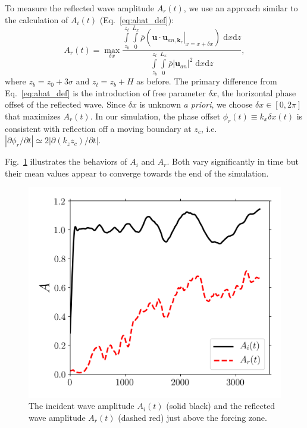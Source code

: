 \documentclass[
        fleqn,
        usenatbib,
    ]{mnras}
\newcommand*{\pdil}[2]{\partial#1/\partial#2}
\newcommand*{\at}[1]{\left.#1\right|}
\newcommand*{\abs}[1]{\left|#1\right|}
\newcommand*{\p}[1]{\left(#1\right)}
\newcommand*{\bm}[1]{\mathbf{#1}}
\begin{document}
To measure the reflected wave amplitude $A_r(t)$, we use an approach similar to
the calculation of $A_i(t)$ (Eq.~\eqref{eq:ahat_def}):
\begin{equation}
    A_r(t) = \max_{\delta x}\frac{\int\limits_{z_b}^{z_t}\int\limits_0^{L_x}
        \overline{\rho}\p{\bm{u} \cdot \at{\bm{u}_{an,
        \bm{k}_r}}_{x = x + \delta x}}\;\mathrm{d}x\mathrm{d}z}
        {\int\limits_{z_b}^{z_t}\int\limits_0^{L_x}
        \overline{\rho}\abs{\bm{u}_{an}}^2\;\mathrm{d}x\mathrm{d}z},
        \label{eq:ar_def}
\end{equation}
where $z_b = z_0 + 3\sigma$ and $z_t = z_b + H$ as before. The primary
difference from Eq.~\eqref{eq:ahat_def} is the introduction of free parameter
$\delta x$, the horizontal phase offset of the reflected wave. Since $\delta x$
is unknown \emph{a priori}, we choose $\delta x \in [0, 2\pi]$ that maximizes
$A_r(t)$. In our simulation, the phase offset $\phi_r(t) \equiv k_x \delta x(t)
$ is consistent with reflection off a moving boundary at $z_c$,
i.e.\ $\abs{\pdil{\phi_r}{t}} \simeq 2\abs{\pdil{(k_{z}z_c)}{t}}$.

Fig.~\ref{fig:nl_f_amps} illustrates the behaviors of $A_i$ and $A_r$. Both vary
significantly in time but their mean values appear to converge towards the end
of the simulation.
\begin{figure}
    \centering
    \includegraphics[width=0.9\columnwidth]{plots/nl_f_amps.png}
    \caption{The incident wave amplitude $A_i(t)$ (solid black) and the
    reflected wave amplitude $A_r(t)$ (dashed red) just above the forcing
    zone.}\label{fig:nl_f_amps}
\end{figure}
\end{document}
